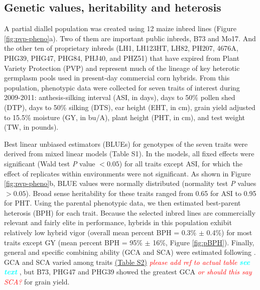 \documentclass[9pt,twocolumn,twoside]{gsajnl}
\newcommand{\yang}[1]{\textcolor{cyan}{\emph{\bf  #1}} }
\newcommand{\jri}[1]{\textcolor{red}{ \emph{ #1}} }
\begin{document}

\subsection*{Genetic values, heritability and heterosis}

A partial diallel population was created using 12 maize inbred lines (Figure \ref{fig:pvp-pheno}a). 
Two of them are important public inbreds, B73 and Mo17. And the other ten of proprietary inbreds (LH1, LH123HT, LH82, PH207, 4676A, PHG39, PHG47, PHG84, PHJ40, and PHZ51) that have expired from Plant Variety Protection (PVP) and represent much of the lineage of key heterotic germplasm pools used in present-day commercial corn hybrids. 
From this population, phenotypic data were collected for seven traits of interest during 2009-2011: anthesis-silking interval (ASI, in days), days to 50\% pollen shed (DTP), days to 50\% silking (DTS), ear height (EHT, in cm), grain yield adjusted to 15.5\% moisture (GY, in bu/A), plant height (PHT, in cm), and test weight (TW, in pounds).

Best linear unbiased estimators (BLUEs) for genotypes of the seven traits were derived from mixed linear models (Table S1). 
In the models, all fixed effects were significant (Wald test \emph{P} value $<0.05$) for all traits except ASI, for which the effect of replicates within environments were not significant. 
As shown in Figure \ref{fig:pvp-pheno}b, BLUE values were normally distributed (normality test \emph{P} values $>0.05$). 
Broad sense heritability for these traits ranged from 0.65 for ASI to 0.95 for PHT. 
Using the parental phenotypic data, we then estimated best-parent heterosis (BPH) for each trait.  
Because the selected inbred lines are commercially relevant and fairly elite in performance, hybrids in this population exhibit relatively low hybrid vigor (overall mean percent BPH = 0.3\% $\pm$ 0.4\%) for most traits except GY (mean percent BPH = 95\% $\pm$ 16\%, Figure \ref{fig:pBPH}). 
Finally, general and specific combining ability (GCA and SCA) were estimated following \citep{Falconer1996}. 
GCA and SCA varied among traits \href{run:https://github.com/RILAB/pvpDiallel/tree/master/manuscript/SI/Table_S2.CA.csv}{(Table S2)} \jri{please add ref to actual table} \yang{see text}, but B73, PHG47 and PHG39 showed the greatest GCA \jri{or should this say SCA?} for grain yield.
\end{document}
